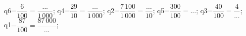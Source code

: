 \documentclass[exercice]{thedocument}%
\begin{document}
%
    \>q6=$\dfrac6{100}=\dfrac{...}{1\,000}$;%
    \>q4=$\dfrac{29}{10}=\dfrac{...}{1\,000}$;%
    \>q2=$\dfrac{7\,100}{1\,000}=\dfrac{...}{10}$;%
    \>q5=$\dfrac{300}{100}=...$;%
    \>q3=$\dfrac{40}{100}=\dfrac{4}{...}$;%
    \>q1=$\dfrac{87}{100}=\dfrac{87\,000}{...}$;%
\end{document}
